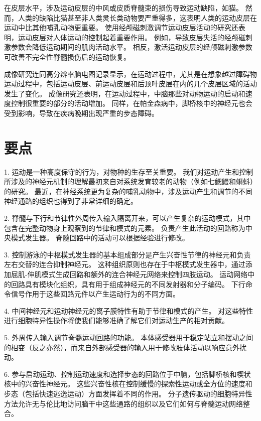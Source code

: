 在皮层水平，涉及运动皮层的中风或皮质脊髓束的损伤导致运动缺陷，如猫。
然而，人类的缺陷比猫甚至非人类灵长类动物要严重得多，这表明人类的运动皮层在运动中比其他哺乳动物更重要。
使用经颅磁刺激调节运动皮层活动的研究还表明，运动皮层对人体运动的控制起着重要作用。
例如，导致皮层失活的经颅磁刺激参数会降低运动期间的肌肉活动水平。
相反，激活运动皮层的经颅磁刺激参数可改善不完全性脊髓损伤后的运动恢复。


成像研究连同高分辨率脑电图记录显示，在运动过程中，尤其是在想象越过障碍物运动过程中，包括运动皮层、前运动皮层和后顶叶皮层在内的几个皮层区域的活动发生了变化。
成像研究还表明，在运动过程中，中脑那些对动物运动的启动和速度控制很重要的部分的活动增加。
同样，在帕金森病中，脚桥核中的神经元也会受到影响，导致在疾病晚期出现严重的步态障碍。



\section{要点}

1. 运动是一种高度保守的行为，对物种的生存至关重要。
我们对运动产生和控制所涉及的神经元机制的理解最初来自对系统发育较老的动物（例如七鳃鳗和蝌蚪）的研究。
最近，在神经系统更为复杂的哺乳动物中，涉及运动产生和调节的不同神经通路的组织也得到了非常详细的确定。 


2. 脊髓与下行和节律性外周传入输入隔离开来，可以产生复杂的运动模式，其中包含在完整动物身上观察到的节律和模式的元素。
负责产生此活动的回路称为中央模式发生器。 
脊髓回路中的活动可以根据经验进行修改。


3. 控制游泳的中枢模式发生器的基本组成部分是产生兴奋性节律的神经元和负责左右交替的连合抑制神经元。
这种组织原则也存在于中枢模式发生器中，通过添加屈肌-伸肌模式生成回路和额外的连合神经元网络来控制四肢运动。
运动网络中的回路具有模块化组织，具有用于组成神经元的不同发射器和分子编码。
下行命令信号作用于这些回路元件以产生运动行为的不同方面。


4. 中间神经元和运动神经元的离子膜特性有助于节律和模式的产生。
对这些特性进行细胞特异性操作将使我们能够准确了解它们对运动生产的相对贡献。


5. 外周传入输入调节脊髓运动回路的功能。
本体感受器用于稳定站立和摆动之间的相变（反之亦然），而来自外部感受器的输入用于修改肢体活动以响应意外扰动。 


6. 参与启动运动、控制运动速度和选择步态的回路位于中脑，包括脚桥核和楔状核中的兴奋性神经元。
这些兴奋性核在控制缓慢的探索性运动或全方位的速度和步态（包括快速逃逸运动）方面发挥着不同的作用。
分子遗传驱动的细胞特异性方法允许无与伦比地访问脑干中这些通路的组织以及它们如何与脊髓运动网络整合。


